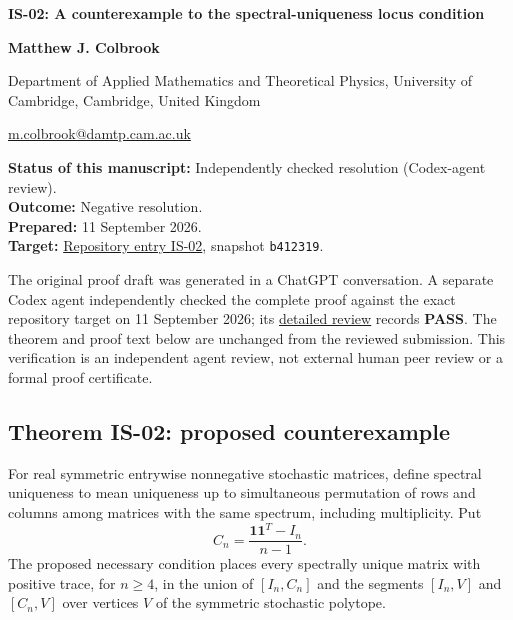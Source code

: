 \documentclass[10pt,a4paper]{article}
\begin{document}
{\raggedright\Large\bfseries IS-02: A counterexample to the
spectral-uniqueness locus condition\par}
\vspace{0.4em}
{\normalsize\bfseries Matthew J. Colbrook\par}
{\small Department of Applied Mathematics and Theoretical Physics,
University of Cambridge, Cambridge, United Kingdom\par}
{\small\href{mailto:m.colbrook@damtp.cam.ac.uk}{m.colbrook@damtp.cam.ac.uk}\par}
\vspace{0.6em}
\textbf{Status of this manuscript:} Independently checked resolution
(Codex-agent review).\\
\textbf{Outcome:} Negative resolution.\\
\textbf{Prepared:} 11 September 2026.\\
\textbf{Target:}
\href{https://github.com/ajt60gaibb/OpenProblemsInNLA/blob/b4123194697bdf6f8f82518c1dd7d6c40a30c2e0/eigenvalues-and-inverse-problems/IS-02/README.md}{Repository
entry IS-02}, snapshot \texttt{b412319}.

The original proof draft was generated in a ChatGPT conversation. A
separate Codex agent independently checked the complete proof against
the exact repository target on 11 September 2026; its
\href{https://github.com/ajt60gaibb/OpenProblemsInNLA/blob/main/references/colbrook-2026-09-11/verification/reviews/IS-02-review.md}{detailed
review} records \textbf{PASS}. The theorem and proof text below are
unchanged from the reviewed submission. This verification is an
independent agent review, not external human peer review or a formal
proof certificate.

\subsection{Theorem IS-02: proposed
counterexample}\label{theorem-is-02-proposed-counterexample}

For real symmetric entrywise nonnegative stochastic matrices, define
spectral uniqueness to mean uniqueness up to simultaneous permutation of
rows and columns among matrices with the same spectrum, including
multiplicity. Put \[
C_n=\frac{\mathbf 1\mathbf 1^T-I_n}{n-1}.
\] The proposed necessary condition places every spectrally unique
matrix with positive trace, for \(n\ge4\), in the union of \([I_n,C_n]\)
and the segments \([I_n,V]\) and \([C_n,V]\) over vertices \(V\) of the
symmetric stochastic polytope.
\end{document}
